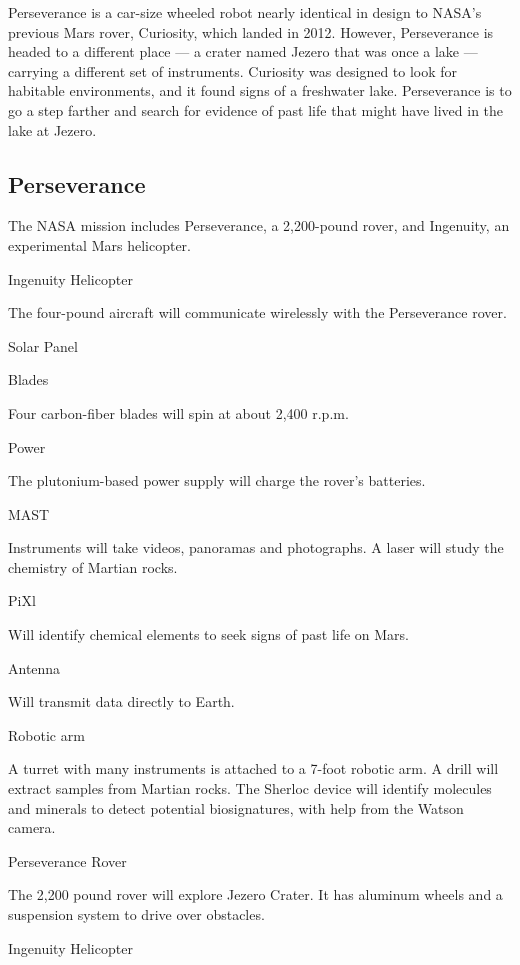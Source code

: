 Perseverance is a car-size wheeled robot nearly identical in design to
NASA's previous Mars rover, Curiosity, which landed in 2012. However,
Perseverance is headed to a different place --- a crater named Jezero
that was once a lake --- carrying a different set of instruments.
Curiosity was designed to look for habitable environments, and it found
signs of a freshwater lake. Perseverance is to go a step farther and
search for evidence of past life that might have lived in the lake at
Jezero.

\hypertarget{perseverance}{%
\subsection{Perseverance}\label{perseverance}}

The NASA mission includes Perseverance, a 2,200-pound rover, and
Ingenuity, an experimental Mars helicopter.

Ingenuity Helicopter

The four-pound aircraft will communicate wirelessly with the
Perseverance rover.

Solar Panel

Blades

Four carbon-fiber blades will spin at about 2,400 r.p.m.

Power

The plutonium-based power supply will charge the rover's batteries.

MAST

Instruments will take videos, panoramas and photographs. A laser will
study the chemistry of Martian rocks.

PiXl

Will identify chemical elements to seek signs of past life on Mars.

Antenna

Will transmit data directly to Earth.

Robotic arm

A turret with many instruments is attached to a 7-foot robotic arm. A
drill will extract samples from Martian rocks. The Sherloc device will
identify molecules and minerals to detect potential biosignatures, with
help from the Watson camera.

Perseverance Rover

The 2,200 pound rover will explore Jezero Crater. It has aluminum wheels
and a suspension system to drive over obstacles.

Ingenuity Helicopter

